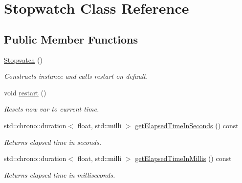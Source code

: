 \hypertarget{class_stopwatch}{}\section{Stopwatch Class Reference}
\label{class_stopwatch}
\subsection*{Public Member Functions}
\begin{DoxyCompactItemize}
\item 
\mbox{\label{class_stopwatch_a628b5ebeed5df065dd847e68fb6336cf}} 
\mbox{\hyperlink{class_stopwatch_a628b5ebeed5df065dd847e68fb6336cf}{Stopwatch}} ()
\begin{DoxyCompactList}\small\item\em Constructs instance and calls restart on default. \end{DoxyCompactList}\item 
\mbox{\label{class_stopwatch_acd64e7c6f80445f25640e7a5dbd4b3be}} 
void \mbox{\hyperlink{class_stopwatch_acd64e7c6f80445f25640e7a5dbd4b3be}{restart}} ()
\begin{DoxyCompactList}\small\item\em Resets now var to current time. \end{DoxyCompactList}\item 
std\+::chrono\+::duration$<$ float, std\+::milli $>$ \mbox{\hyperlink{class_stopwatch_a8fd9786f99abeb8289ba235d0e47cf26}{get\+Elapsed\+Time\+In\+Seconds}} () const
\begin{DoxyCompactList}\small\item\em Returns elapsed time in seconds. \end{DoxyCompactList}\item 
std\+::chrono\+::duration$<$ float, std\+::milli $>$ \mbox{\hyperlink{class_stopwatch_a5d69cdef517efa260d22218ffc2646d3}{get\+Elapsed\+Time\+In\+Millis}} () const
\begin{DoxyCompactList}\small\item\em Returns elapsed time in milliseconds. \end{DoxyCompactList}\end{DoxyCompactItemize}
